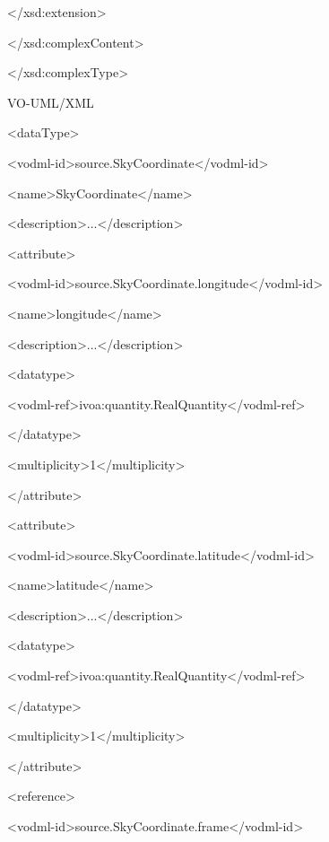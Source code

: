\documentclass[10pt,a4paper]{ivoa}
\begin{document}
\textless/xsd:extension\textgreater{}

\textless/xsd:complexContent\textgreater{}

\textless/xsd:complexType\textgreater{}

VO-UML/XML

\textless dataType\textgreater{}

\textless vodml-id\textgreater source.SkyCoordinate\textless/vodml-id\textgreater{}

\textless name\textgreater SkyCoordinate\textless/name\textgreater{}

\textless description\textgreater...\textless/description\textgreater{}

\textless attribute\textgreater{}

\textless vodml-id\textgreater source.SkyCoordinate.longitude\textless/vodml-id\textgreater{}

\textless name\textgreater longitude\textless/name\textgreater{}

\textless description\textgreater...\textless/description\textgreater{}

\textless datatype\textgreater{}

\textless vodml-ref\textgreater ivoa:quantity.RealQuantity\textless/vodml-ref\textgreater{}

\textless/datatype\textgreater{}

\textless multiplicity\textgreater1\textless/multiplicity\textgreater{}

\textless/attribute\textgreater{}

\textless attribute\textgreater{}

\textless vodml-id\textgreater source.SkyCoordinate.latitude\textless/vodml-id\textgreater{}

\textless name\textgreater latitude\textless/name\textgreater{}

\textless description\textgreater...\textless/description\textgreater{}

\textless datatype\textgreater{}

\textless vodml-ref\textgreater ivoa:quantity.RealQuantity\textless/vodml-ref\textgreater{}

\textless/datatype\textgreater{}

\textless multiplicity\textgreater1\textless/multiplicity\textgreater{}

\textless/attribute\textgreater{}

\textless reference\textgreater{}

\textless vodml-id\textgreater source.SkyCoordinate.frame\textless/vodml-id\textgreater{}
\end{document}
